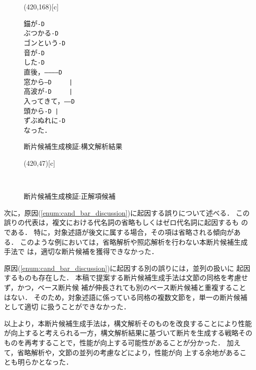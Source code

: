 \documentclass[japanese]{jnlp_1.2b}
\begin{document}
\begin{figure}[t]
\framebox(420,168)[c]{\parbox{135pt}{
	\hfil 錨が\texttt{-D~~~~~~~~~~~~~~~~~~~~}\\
	\hfil ぶつかる\texttt{-D~~~~~~~~~~~~~~~~~~}\\
	\hfil ゴンという\texttt{-D~~~~~~~~~~~~~~~~}\\
	\hfil 音が\texttt{-D~~~~~~~~~~~~~~}\\
	\hfil した\texttt{-D~~~~~~~~~~~~}\\
	\hfil 直後，\texttt{-----------D}\\
	\hfil 窓から\texttt{---D~~~~~|}\\
	\hfil 高波が\texttt{-D~~~~~|}\\
	\hfil 入ってきて，\texttt{-----D}\\
	\hfil 頭から\texttt{-D~|}\\
	\hfil ずぶぬれに\texttt{-D}\\
	\hfil なった．
}}
 \caption{断片候補生成検証:構文解析結果}
 \label{fig:syn_analyze_discussion3}
    \par\vspace{20pt}
\framebox(420,47)[c]{\parbox{340pt}{
 \\[0.5\baselineskip]
\hfill {}
}}
 \caption{断片候補生成検証:正解項候補}
 \label{fig:candidating_discussion3}
\end{figure}


次に，原因(\ref{enum:cand_bar_discussion})に起因する誤りについて述べる．
この誤りの代表は，複文における代名詞の省略もしくはゼロ代名詞に起因するも
のである．
特に，対象述語が後文に属する場合，その項は省略される傾向がある．
このような例においては，省略解析や照応解析を行わない本断片候補生成手法で
は，適切な断片候補を獲得できなかった．




原因(\ref{enum:cand_bar_discussion})に起因する別の誤りには，並列の扱いに
起因するものも存在した．
本稿で提案する断片候補生成手法は文節の同格を考慮せず，かつ，ベース断片候
補が伸長されても別のベース断片候補と重複することはない．
そのため，対象述語に係っている同格の複数文節を，単一の断片候補として適切
に扱うことができなかった．


以上より，本断片候補生成手法は，構文解析そのものを改良することにより性能
が向上すると考えられる一方，構文解析結果に基づいて断片を生成する戦略その
ものを再考することで，性能が向上する可能性があることが分かった．
加えて，省略解析\cite{sasano04}や，文節の並列の考慮などにより，性能が向
上する余地があることも明らかとなった．
\end{document}
